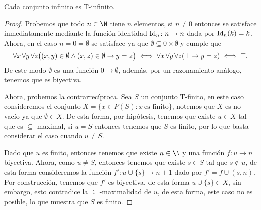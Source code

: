 \begin{exercise}[1.13]
  Cada conjunto infinito es T-infinito.
\end{exercise}
\begin{proof}
  Probemos que todo $n \in \N$ tiene $n$ elementos, si $n \neq 0$ entonces se satisface inmediatamente mediante la función identidad $\mathrm{Id}_n \colon n \to n$ dada por $\mathrm{Id}_n(k) = k$. Ahora, en el caso $n = 0 = \emptyset$ se satisface ya que $\emptyset \subseteq 0 \times \emptyset$ y cumple que 
  \[
    \forall x \forall y \forall z \bigl( (x,y) \in \emptyset \land (x,z) \in \emptyset \lthen y = z \bigr) 
    \iff
    \forall x \forall y \forall z (\lfalse  \lthen y = z )
    \iff \ltrue.
  \]
  De este modo $\emptyset$ es una función $ 0 \to \emptyset$, además, por un razonamiento análogo, tenemos que es biyectiva.

  Ahora, probemos la contrarrecíproca. Sea $S$ un conjunto T-finito, en este caso consideremos el conjunto $X = \{x \in P(S) : x \ \text{es finito}\}$, notemos que $X$ es no vacío ya que $\emptyset \in X$. De esta forma, por hipótesis, tenemos que existe $u \in X$ tal que es $\subseteq$-maximal, si $u = S$ entonces tenemos que $S$ es finito, por lo que basta considerar el caso cuando $u \neq S$.

  Dado que $u$ es finito, entonces tenemos que existe $n \in \N$ y una función $f\colon u \to n$ biyectiva. Ahora, como $u \neq S$, entonces tenemos que existe $s \in S$ tal que $s \notin u$, de esta forma consideremos la función $f'\colon u \cup \{s\} \to n+1$ dado por $f' = f \cup (s, n)$. Por construcción, tenemos que $f'$ es biyectiva, de esta forma $u \cup \{s\} \in X$, sin embargo, esto contradice la $\subseteq$-maximalidad de $u$, de esta forma, este caso no es posible, lo que muestra que $S$ es finito.
\end{proof}